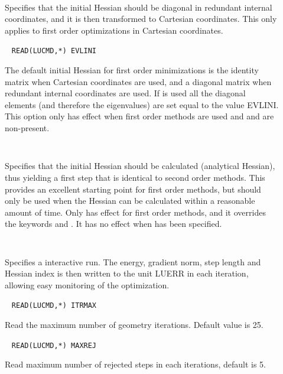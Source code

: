 \begin{description}
\item[]\verb| |

Specifies that the initial Hessian should be diagonal in redundant
internal coordinates, and it is then transformed to Cartesian
coordinates. This only applies to first order optimizations in
Cartesian coordinates.

\item[]\verb| |
\newline
\verb|READ(LUCMD,*) EVLINI|

The default initial Hessian for first order minimizations is the
identity matrix when Cartesian coordinates are used, and a diagonal
matrix when redundant internal coordinates are used. If 
is used all the diagonal elements (and therefore the eigenvalues) are
set equal to the value EVLINI. This option only has effect when first
order methods are used and  and  are
non-present.

\item[]\verb| |

Specifies that the initial Hessian should be
calculated (analytical Hessian), thus yielding a first step that is
identical to second order methods. This provides an excellent starting
point for first order methods, but should only be used when the
Hessian can be calculated within a reasonable amount of time. Only has
effect for first order methods, and it overrides the keywords
 and . It has no effect when  has
been specified.

\item[]\verb| |

Specifies a interactive run. The energy, gradient
norm, step length and Hessian index is then written to the unit LUERR
in each iteration, allowing easy monitoring of the optimization.

\item[]\verb| |
\newline
\verb|READ(LUCMD,*) ITRMAX|

Read the maximum number of geometry iterations. Default value is 25.

\item[]\verb| |
\newline
\verb|READ(LUCMD,*) MAXREJ|

Read maximum number of rejected steps in each iterations, default is
5.

\item[]\verb| |


\end{description}
